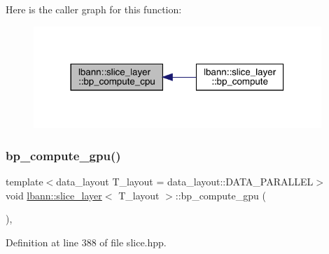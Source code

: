 Here is the caller graph for this function\+:\nopagebreak
\begin{figure}[H]
\begin{center}
\leavevmode
\includegraphics[width=308pt]{classlbann_1_1slice__layer_af5d6887cac9a0c3afab8f361cdf81034_icgraph}
\end{center}
\end{figure}
\mbox{\label{classlbann_1_1slice__layer_a798c10e5c19f58e38da9d2d50c49ca3e}} 
\subsubsection{\texorpdfstring{bp\+\_\+compute\+\_\+gpu()}{bp\_compute\_gpu()}}
{\footnotesize\ttfamily template$<$data\+\_\+layout T\+\_\+layout = data\+\_\+layout\+::\+D\+A\+T\+A\+\_\+\+P\+A\+R\+A\+L\+L\+EL$>$ \\
void \hyperlink{classlbann_1_1slice__layer}{lbann\+::slice\+\_\+layer}$<$ T\+\_\+layout $>$\+::bp\+\_\+compute\+\_\+gpu (\begin{DoxyParamCaption}{ }\end{DoxyParamCaption})\hspace{0.3cm}{\ttfamily [inline]}, {\ttfamily [protected]}}



Definition at line 388 of file slice.\+hpp.


